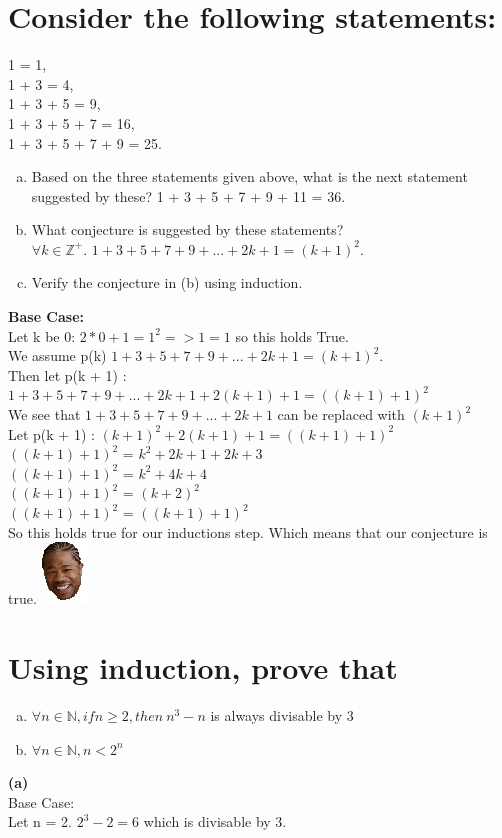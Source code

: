 \section{Consider the following statements:}
1 = 1,\\
1 + 3 = 4,\\
1 + 3 + 5 = 9,\\
1 + 3 + 5 + 7 = 16,\\
1 + 3 + 5 + 7 + 9 = 25.\\
\begin{enumerate}[(a)]
\item Based on the three statements given above, what is the next statement suggested by these?
1 + 3 + 5 + 7 + 9 + 11 = 36.
\item What conjecture is suggested by these statements?\\
$\forall k \in \mathbb{Z}^{+}$. $1 + 3 + 5 + 7 + 9 + ... + 2k + 1 = (k + 1)^2$. 
\item Verify the conjecture in (b) using induction.
\end{enumerate}
\textbf{Base Case:}\\
Let k be 0: $2*0 + 1 = 1^2 => 1 = 1$ so this holds True.\\
We assume p(k)
$1 + 3 + 5 + 7 + 9 + ... + 2k + 1 = (k + 1)^2$.\\
Then let p(k + 1) : $1+3+5+7+9+...+2k+1 + 2(k + 1) + 1=((k+1)+1)^2$\\
We see that $1 + 3 + 5 + 7 + 9 + ...+2k+1$ can be replaced with $(k+1)^2$\\
Let p(k + 1) : $(k + 1)^2 + 2(k + 1) + 1=((k+1)+1)^2$\\
$((k+1)+1)^2$ = $k^2 + 2k + 1 + 2k + 3$\\
$((k+1)+1)^2$ = $k^2 + 4k + 4$\\
$((k+1)+1)^2$ = $(k + 2)^2$\\
$((k+1)+1)^2$ = $((k + 1) + 1)^2$\\
 So this holds true for our inductions step. Which means that our conjecture is true. \includegraphics[scale=0.70]{billeder/xzibit}


\section{Using induction, prove that}
\begin{enumerate}[(a)]
\item $\forall n \in \mathbb{N}, if n\geq 2, then \ n^3-n$ is always divisable by 3
\item $\forall n \in \mathbb{N},n < 2^n$
\end{enumerate}
\textbf{(a)}\\
Base Case:\\
Let n = 2. $2^3 - 2 = 6$ which is divisable by 3.\\

